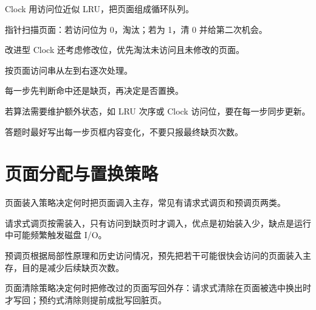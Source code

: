 \begin{points}
  \item Clock 用访问位近似 LRU，把页面组成循环队列。
  \item 指针扫描页面：若访问位为 0，淘汰；若为 1，清 0 并给第二次机会。
  \item 改进型 Clock 还考虑修改位，优先淘汰未访问且未修改的页面。
\end{points}

\begin{points}
  \item 按页面访问串从左到右逐次处理。
  \item 每一步先判断命中还是缺页，再决定是否置换。
  \item 若算法需要维护额外状态，如 LRU 次序或 Clock 访问位，要在每一步同步更新。
  \item 答题时最好写出每一步页框内容变化，不要只报最终缺页次数。
\end{points}


\section{页面分配与置换策略}
\begin{points}
  \item 页面装入策略决定何时把页面调入主存，常见有请求式调页和预调页两类。
  \item 请求式调页按需装入，只有访问到缺页时才调入，优点是初始装入少，缺点是运行中可能频繁触发磁盘 I/O。
  \item 预调页根据局部性原理和历史访问情况，预先把若干可能很快会访问的页面装入主存，目的是减少后续缺页次数。
  \item 页面清除策略决定何时把修改过的页面写回外存：请求式清除在页面被选中换出时才写回；预约式清除则提前成批写回脏页。
\end{points}

